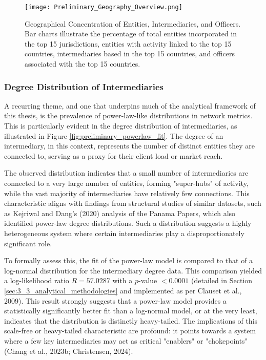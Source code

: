 \begin{figure}[htbp]
    \centering
    \texttt{[image: Preliminary\_Geography\_Overview.png]} %
    \caption{Geographical Concentration of Entities, Intermediaries, and Officers. Bar charts illustrate the percentage of total entities incorporated in the top 15 jurisdictions, entities with activity linked to the top 15 countries, intermediaries based in the top 15 countries, and officers associated with the top 15 countries.}
    \label{fig:preliminary_geography_overview}
\end{figure}

\subsubsection{Degree Distribution of Intermediaries}
\label{subsubsec:degree_dist_intermediaries}
A recurring theme, and one that underpins much of the analytical framework of this thesis, is the prevalence of power-law-like distributions in network metrics. This is particularly evident in the degree distribution of intermediaries, as illustrated in Figure \ref{fig:preliminary_powerlaw_fit}. The degree of an intermediary, in this context, represents the number of distinct entities they are connected to, serving as a proxy for their client load or market reach.

The observed distribution indicates that a small number of intermediaries are connected to a very large number of entities, forming "super-hubs" of activity, while the vast majority of intermediaries have relatively few connections. This characteristic aligns with findings from structural studies of similar datasets, such as Kejriwal and Dang's (2020) analysis of the Panama Papers, which also identified power-law degree distributions. Such a distribution suggests a highly heterogeneous system where certain intermediaries play a disproportionately significant role.

To formally assess this, the fit of the power-law model is compared to that of a log-normal distribution for the intermediary degree data. This comparison yielded a log-likelihood ratio $R = 57.0287$ with a $p$-value $< 0.0001$ (detailed in Section \ref{sec:3_3_analytical_methodologies} and implemented as per Clauset et al., 2009). This result strongly suggests that a power-law model provides a statistically significantly better fit than a log-normal model, or at the very least, indicates that the distribution is distinctly heavy-tailed. The implications of this scale-free or heavy-tailed characteristic are profound: it points towards a system where a few key intermediaries may act as critical "enablers" or "chokepoints" (Chang et al., 2023b; Christensen, 2024).

